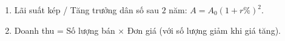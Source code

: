 \begin{enumerate}
\item Lãi suất kép / Tăng trưởng dân số sau $2$ năm: $A = A_0(1 + r\%)^2$.
\item Doanh thu = Số lượng bán $\times$ Đơn giá (với số lượng giảm khi giá tăng).
\end{enumerate}

